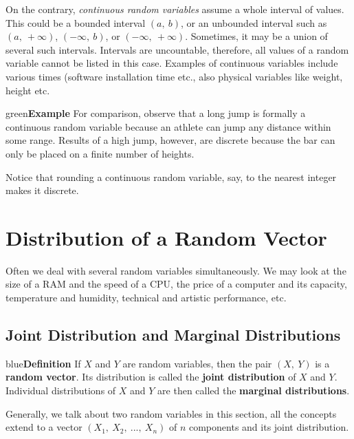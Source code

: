 \documentclass{article}
\newenvironment{example}[1]{\begin{mybox}{green}{\textbf{Example #1}}}{\end{mybox}}
\newenvironment{definition}[1]{\begin{mybox}{blue}{\textbf{Definition #1}}}{\end{mybox}}
\begin{document}
On the contrary, \textit{continuous random variables} assume a whole interval of values. This could be a bounded interval $(a,\ b)$, or an unbounded interval such as $(a,\ +\infty)$, $(-\infty,\ b)$, or $(-\infty,\ +\infty)$. Sometimes, it may be a union of several such intervals. Intervals are uncountable, therefore, all values of a random variable cannot be listed in this case. Examples of continuous variables include various times (software installation time etc., also physical variables like weight, height etc.

\begin{example}{}
For comparison, observe that a long jump is formally a continuous random
variable because an athlete can jump any distance within some range. Results of a high jump, however, are discrete because the bar can only be placed on a finite number of heights. 
\end{example}
Notice that rounding a continuous random variable, say, to the nearest integer makes it discrete.


\section{Distribution of a Random Vector}

Often we deal with several random variables simultaneously. We may look at the size of a RAM and the speed of a CPU, the price of a computer and its capacity, temperature and humidity, technical and artistic performance, etc.

\subsection{Joint Distribution and Marginal Distributions}

\begin{definition}{}
If $X$ and $Y$ are random variables, then the pair $(X,\ Y)$ is a \textbf{random vector}. Its distribution is called the \textbf{joint distribution} of $X$ and $Y$. Individual distributions of $X$ and $Y$ are then called the \textbf{marginal distributions}.
\end{definition}
Generally, we talk about two random variables in this section, all the concepts extend to a vector $(X_1,\ X_2,\ ...,\ X_n)$ of $n$ components and its joint distribution.
\end{document}
